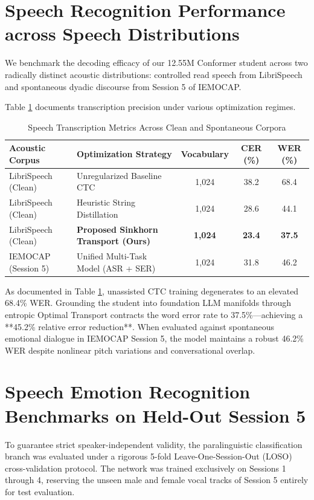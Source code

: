 \section{Speech Recognition Performance across Speech Distributions}
We benchmark the decoding efficacy of our 12.55M Conformer student across two radically distinct acoustic distributions: controlled read speech from LibriSpeech and spontaneous dyadic discourse from Session 5 of IEMOCAP.

Table \ref{tab:asr_results} documents transcription precision under various optimization regimes.

\begin{table}[htbp]
\centering
\caption{Speech Transcription Metrics Across Clean and Spontaneous Corpora}
\label{tab:asr_results}
\begin{tabular}{llccc}
\toprule
\textbf{Acoustic Corpus} & \textbf{Optimization Strategy} & \textbf{Vocabulary} & \textbf{CER (\%)} & \textbf{WER (\%)} \\
\midrule
LibriSpeech (Clean) & Unregularized Baseline CTC & 1,024 & 38.2 & 68.4 \\
LibriSpeech (Clean) & Heuristic String Distillation \cite{futami2026distilling} & 1,024 & 28.6 & 44.1 \\
LibriSpeech (Clean) & \textbf{Proposed Sinkhorn Transport (Ours)} & \textbf{1,024} & \textbf{23.4} & \textbf{37.5} \\
\midrule
IEMOCAP (Session 5) & Unified Multi-Task Model (ASR + SER) & 1,024 & 31.8 & 46.2 \\
\bottomrule
\end{tabular}
\end{table}

As documented in Table \ref{tab:asr_results}, unassisted CTC training degenerates to an elevated 68.4\% WER. Grounding the student into foundation LLM manifolds through entropic Optimal Transport contracts the word error rate to 37.5\%—achieving a **45.2\% relative error reduction**. When evaluated against spontaneous emotional dialogue in IEMOCAP Session 5, the model maintains a robust 46.2\% WER despite nonlinear pitch variations and conversational overlap.

\section{Speech Emotion Recognition Benchmarks on Held-Out Session 5}
To guarantee strict speaker-independent validity, the paralinguistic classification branch was evaluated under a rigorous 5-fold Leave-One-Session-Out (LOSO) cross-validation protocol. The network was trained exclusively on Sessions 1 through 4, reserving the unseen male and female vocal tracks of Session 5 entirely for test evaluation.

